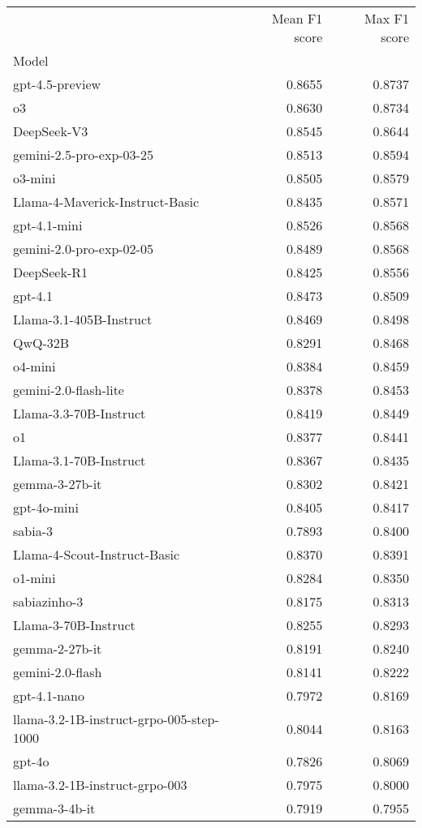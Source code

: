 \begin{tabular}{lrr}
\toprule
 & Mean F1 score & Max F1 score \\
Model &  &  \\
\midrule
gpt-4.5-preview & 0.8655 & 0.8737 \\
o3 & 0.8630 & 0.8734 \\
DeepSeek-V3 & 0.8545 & 0.8644 \\
gemini-2.5-pro-exp-03-25 & 0.8513 & 0.8594 \\
o3-mini & 0.8505 & 0.8579 \\
Llama-4-Maverick-Instruct-Basic & 0.8435 & 0.8571 \\
gpt-4.1-mini & 0.8526 & 0.8568 \\
gemini-2.0-pro-exp-02-05 & 0.8489 & 0.8568 \\
DeepSeek-R1 & 0.8425 & 0.8556 \\
gpt-4.1 & 0.8473 & 0.8509 \\
Llama-3.1-405B-Instruct & 0.8469 & 0.8498 \\
QwQ-32B & 0.8291 & 0.8468 \\
o4-mini & 0.8384 & 0.8459 \\
gemini-2.0-flash-lite & 0.8378 & 0.8453 \\
Llama-3.3-70B-Instruct & 0.8419 & 0.8449 \\
o1 & 0.8377 & 0.8441 \\
Llama-3.1-70B-Instruct & 0.8367 & 0.8435 \\
gemma-3-27b-it & 0.8302 & 0.8421 \\
gpt-4o-mini & 0.8405 & 0.8417 \\
sabia-3 & 0.7893 & 0.8400 \\
Llama-4-Scout-Instruct-Basic & 0.8370 & 0.8391 \\
o1-mini & 0.8284 & 0.8350 \\
sabiazinho-3 & 0.8175 & 0.8313 \\
Llama-3-70B-Instruct & 0.8255 & 0.8293 \\
gemma-2-27b-it & 0.8191 & 0.8240 \\
gemini-2.0-flash & 0.8141 & 0.8222 \\
gpt-4.1-nano & 0.7972 & 0.8169 \\
llama-3.2-1B-instruct-grpo-005-step-1000 & 0.8044 & 0.8163 \\
gpt-4o & 0.7826 & 0.8069 \\
llama-3.2-1B-instruct-grpo-003 & 0.7975 & 0.8000 \\
gemma-3-4b-it & 0.7919 & 0.7955 \\

\end{tabular}
